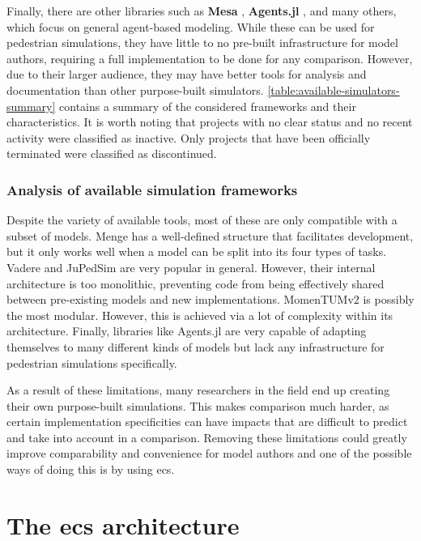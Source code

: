 \documentclass[twoside, 11pt]{article}
\begin{document}
Finally, there are other libraries such as \textbf{Mesa} \cite{hoevenMesa3Agentbased2025}, \textbf{Agents.jl} \cite{Agents.jl}, and many others, which focus on general agent-based modeling. While these can be used for pedestrian simulations, they have little to no pre-built infrastructure for model authors, requiring a full implementation to be done for any comparison. However, due to their larger audience, they may have better tools for analysis and documentation than other purpose-built simulators. \autoref{table:available-simulators-summary} contains a summary of the considered frameworks and their characteristics. It is worth noting that projects with no clear status and no recent activity were classified as inactive. Only projects that have been officially terminated were classified as discontinued.

\subsubsection{Analysis of available simulation frameworks} \label{sec:framework-comparison}

Despite the variety of available tools, most of these are only compatible with a subset of models. Menge has a well-defined structure that facilitates development, but it only works well when a model can be split into its four types of tasks. Vadere and JuPedSim are very popular in general. However, their internal architecture is too monolithic, preventing code from being effectively shared between pre-existing models and new implementations. MomenTUMv2 is possibly the most modular. However, this is achieved via a lot of complexity within its architecture. Finally, libraries like Agents.jl are very capable of adapting themselves to many different kinds of models but lack any infrastructure for pedestrian  simulations specifically.

As a result of these limitations, many researchers in the field end up creating their own purpose-built simulations. This makes comparison much harder, as certain implementation specificities can have impacts that are difficult to predict and take into account in a comparison. Removing these limitations could greatly improve comparability and convenience for model authors and one of the possible ways of doing this is by using \gls{ecs}.

\section{The \acrlong{ecs} architecture} \label{sec:ecs-architecture}
\end{document}
